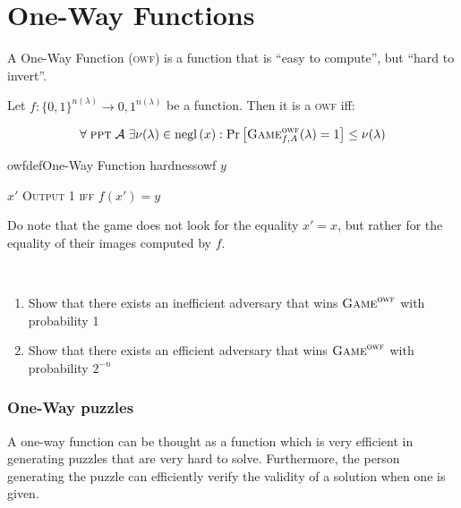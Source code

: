 \section{One-Way Functions}

A One-Way Function (\textsc{owf}) is a function that is ``easy to compute'', but ``hard to invert''.

\begin{definition}    
    Let $f : \{0,1\}^{n(\lambda)} \to {0,1}^{n(\lambda)}$ be a function. Then it is a \textsc{owf} iff:

    \begin{equation}
        \forall\; \textsc{ppt}\; \mathcal{A}\;
        \exists\nu(\lambda) \in \mathrm{negl}\left({x}\right) :
        \Pr \left[ \textsc{Game}_{f,A}^\textsc{owf} (\lambda) = 1 \right]
        \leq \nu(\lambda)
    \end{equation}

\end{definition}


\begin{cryptogame}{owfdef}{One-Way Function hardness}{owf}
    {$y$}
    {}

    \postlevel

    \send{}
    {$x'$}
    {\textsc{Output 1 iff} $f(x')=y$}

\end{cryptogame}

Do note that the game does not look for the equality $x' = x$, but rather for the equality of their images computed by $f$.

\pagebreak

\begin{exercise}
    \
    \begin{enumerate}
        \item Show that there exists an inefficient adversary that wins $\textsc{Game}^\textsc{owf}$ with probability 1
        \item Show that there exists an efficient adversary that wins $\textsc{Game}^\textsc{owf}$ with probability $2^{-n}$
    \end{enumerate}
\end{exercise}


\subsubsection{One-Way puzzles}
A one-way function can be thought as a function which is very efficient in generating puzzles that are very hard to solve. Furthermore, the person generating the puzzle can efficiently verify the validity of a solution when one is given.

